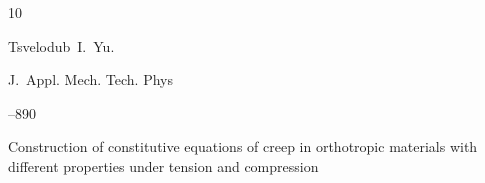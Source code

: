 \begin{thebibliography}{10}

\by Tsvelodub~I.~Yu.

\jour J.~Appl. Mech. Tech. Phys 





–890 

\paper Construction of constitutive equations of creep in orthotropic materials with different properties under tension and compression





\end{thebibliography}







\renewcommand{\baselinestretch}{0.9}



%

